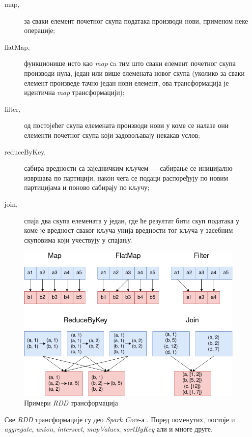 \documentclass[12pt,oneside]{memoir}
\begin{document}
\begin{description}
	\item[map,] за сваки елемент почетног скупа података производи нови, применом неке операције;
	\item[flatMap,] функционише исто као \textit{map} сa тим што сваки елемент почетног скупа производи нула, један или више елемената новог скупа (уколико за сваки елемент произведе тачно један нови елемент, ова трансформација је идентична \textit{map} трансформацији);
	\item[filter,] од постојећег скупа елемената производи нови у коме се налазе они елементи почетног скупа који задовољавају некакав услов;
	\item[reduceByKey,] сабира вредности са заједничким кључем --- сабирање се иницијално извршава по партицији, након чега се подаци распоређују по новим партицијама и поново сабирају по кључу;
	\item[join,] спаја два скупа елемената у један, где ће резултат бити скуп података у коме је вредност сваког кључа унија вредности тог кључа у засебним скуповима који учествују у спајању.
\end{description}

\begin{figure}[!ht]
  \centering
  \includegraphics[width=1\textwidth]{pictures/transf_examples.png}
  \caption{Примери \textit{RDD} трансформација}
  \label{fig:sprk_trnsf_examples}
\end{figure}

Све \textit{RDD} трансформације су део \textit{Spark Core}-а \cite{spark_rdd_transf}. Поред поменутих, постоје и \textit{aggregate}, \textit{union}, \textit{intersect}, \textit{mapValues}, \textit{sortByKey} али и многе друге.
\end{document}
